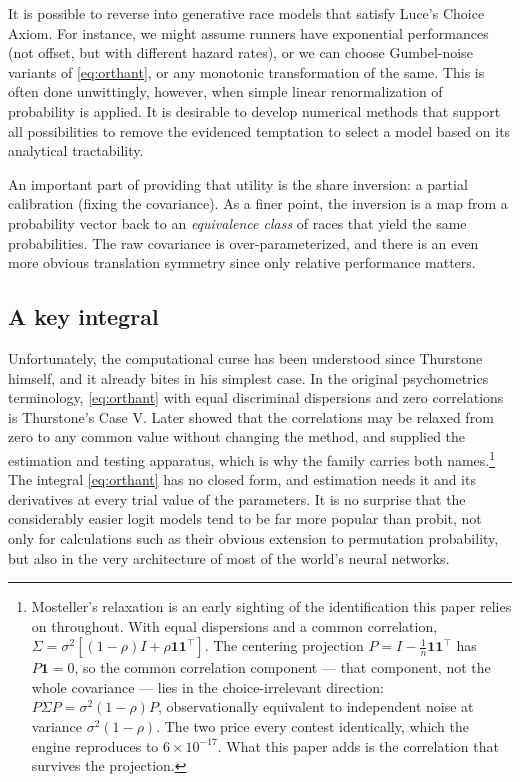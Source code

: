 \documentclass[11pt]{article}
\begin{document}
It is possible to reverse into generative race models that satisfy Luce's Choice Axiom. For instance, we might assume runners have exponential performances (not offset, but with different hazard rates), or we can choose Gumbel-noise variants of \eqref{eq:orthant}, or any monotonic transformation of the same. This is often done unwittingly, however, when simple linear renormalization of probability is applied. It is desirable to develop numerical methods that support all possibilities to remove the evidenced temptation to select a model based on its analytical tractability.

An important part of providing that utility is the share inversion: a partial calibration (fixing the covariance). As a finer point, the inversion is a map from a probability vector back to an {\em equivalence class} of races that yield the same probabilities. The raw covariance is over-parameterized, and there is an even more obvious translation symmetry since only relative performance matters.


\subsection{A key integral}

Unfortunately, the computational curse has been understood since Thurstone himself,
and it already bites in his simplest case. In the original psychometrics
terminology, \eqref{eq:orthant} with equal discriminal dispersions and
zero correlations is Thurstone's Case V. Later \citet{mosteller1951} showed
that the correlations may be relaxed from zero to any common value without
changing the method, and supplied the estimation and testing apparatus,
which is why the family carries both names.\footnote{Mosteller's
relaxation is an early sighting of the identification this paper relies
on throughout. With equal dispersions and a common correlation,
$\Sigma=\sigma^2[(1-\rho)I+\rho\mathbf{1}\mathbf{1}^{\top}]$. The
centering projection $P=I-\tfrac1n\mathbf{1}\mathbf{1}^{\top}$ has
$P\mathbf{1}=0$, so the common correlation component --- that component, not
the whole covariance --- lies in the choice-irrelevant direction:
$P\Sigma P=\sigma^2(1-\rho)P$, observationally equivalent to independent
noise at variance $\sigma^2(1-\rho)$. The two price every contest
identically, which the engine reproduces to $6\times10^{-17}$. What this
paper adds is the correlation that survives the projection.} The integral \eqref{eq:orthant} has no closed form, and estimation
needs it and its derivatives at every trial value of the parameters. It is no surprise that the considerably easier logit models tend to be far more popular than probit, not only for calculations such as their obvious extension to permutation probability, but also in the very architecture of most of the world's neural networks.
\end{document}
